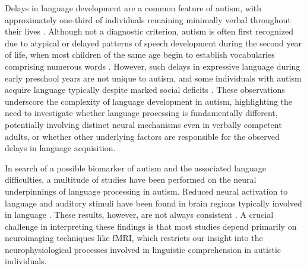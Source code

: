 Delays in language development are a common feature of autism, with approximately one-third of individuals remaining minimally verbal throughout their lives \citep{apa2013,kim2014,velikonja2019}. Although not a diagnostic criterion, autism is often first recognized due to atypical or delayed patterns of speech development during the second year of life, when most children of the same age begin to establish vocabularies comprising numerous words \citep{short1988}. However, such delays in expressive language during early preschool years are not unique to autism, and some individuals with autism acquire language typically despite marked social deficits \citep{anderson2007}. These observations underscore the complexity of language development in autism, highlighting the need to investigate whether language processing is fundamentally different, potentially involving distinct neural mechanisms even in verbally competent adults, or whether other underlying factors are responsible for the observed delays in language acquisition.

In search of a possible biomarker of autism and the associated language difficulties, a multitude of studies have been performed on the neural underpinnings of language processing in autism. Reduced neural activation to language and auditory stimuli have been found in brain regions typically involved in language \citep[for reviews]{groen2008,philip2012}. These results, however, are not always consistent \citep{tryfon2018}. A crucial challenge in interpreting these findings is that most studies depend primarily on neuroimaging techniques like fMRI, which restricts our insight into the neurophysiological processes involved in linguistic comprehension in autistic individuals. 

